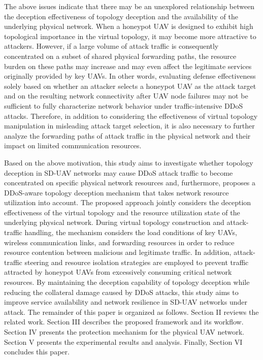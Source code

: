 \begin{ZhChapter}
The above issues indicate that there may be an unexplored relationship between the deception effectiveness of topology deception and the availability of the underlying physical network. When a honeypot UAV is designed to exhibit high topological importance in the virtual topology, it may become more attractive to attackers. However, if a large volume of attack traffic is consequently concentrated on a subset of shared physical forwarding paths, the resource burden on these paths may increase and may even affect the legitimate services originally provided by key UAVs. In other words, evaluating defense effectiveness solely based on whether an attacker selects a honeypot UAV as the attack target and on the resulting network connectivity after UAV node failures may not be sufficient to fully characterize network behavior under traffic-intensive DDoS attacks. Therefore, in addition to considering the effectiveness of virtual topology manipulation in misleading attack target selection, it is also necessary to further analyze the forwarding paths of attack traffic in the physical network and their impact on limited communication resources.

Based on the above motivation, this study aims to investigate whether topology deception in SD-UAV networks may cause DDoS attack traffic to become concentrated on specific physical network resources and, furthermore, proposes a DDoS-aware topology deception mechanism that takes network resource utilization into account. The proposed approach jointly considers the deception effectiveness of the virtual topology and the resource utilization state of the underlying physical network. During virtual topology construction and attack-traffic handling, the mechanism considers the load conditions of key UAVs, wireless communication links, and forwarding resources in order to reduce resource contention between malicious and legitimate traffic. In addition, attack-traffic steering and resource isolation strategies are employed to prevent traffic attracted by honeypot UAVs from excessively consuming critical network resources. By maintaining the deception capability of topology deception while reducing the collateral damage caused by DDoS attacks, this study aims to improve service availability and network resilience in SD-UAV networks under attack.
The remainder of this paper is organized as follows. Section II reviews the related work. Section III describes the proposed framework and its workflow. Section IV presents the protection mechanism for the physical UAV network. Section V presents the experimental results and analysis. Finally, Section VI concludes this paper.
\end{ZhChapter}